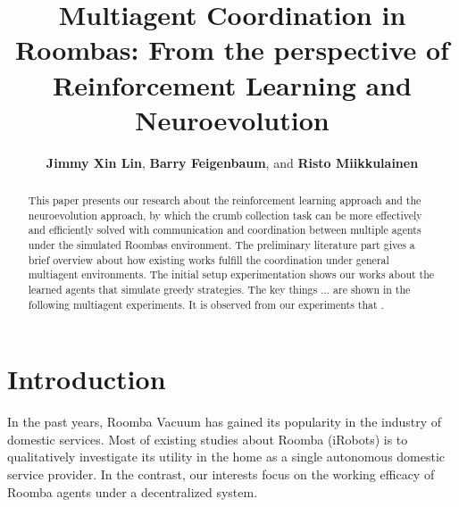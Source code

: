 \documentclass[conference]{IEEEtran}
\begin{document}
%
\title{Multiagent Coordination in Roombas: From the perspective of
    Reinforcement Learning and Neuroevolution}


\author{\textbf{Jimmy Xin Lin}, \textbf{Barry Feigenbaum}, and \textbf{Risto Miikkulainen}}


\maketitle

\begin{abstract}
    This paper presents our research about the reinforcement learning approach
    and the neuroevolution approach, by which the crumb collection task can be
    more effectively and efficiently solved with communication and
    coordination between multiple agents under the simulated Roombas
    environment.
    The preliminary literature part gives a brief overview about how existing
    works fulfill the coordination under general multiagent environments.
    The initial setup experimentation shows our works about the
    learned agents that simulate greedy strategies.
    The key things ... are shown in the following multiagent experiments.
    It is observed from our experiments that .
\end{abstract}

\IEEEpeerreviewmaketitle



\section{Introduction}
In the past years, Roomba Vacuum has gained its popularity in the industry of
domestic services.  Most of existing studies about Roomba (iRobots) is to 
qualitatively investigate its utility in the home as a single autonomous
domestic service provider. In the contrast, our interests focus on the working
efficacy of Roomba agents under a decentralized system.
\end{document}
